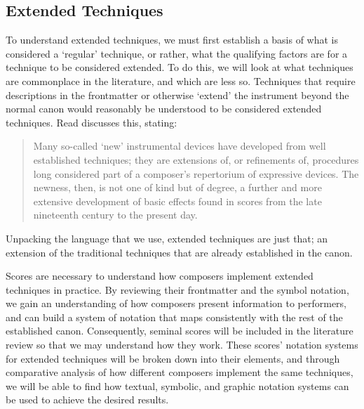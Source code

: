 \subsection{Extended Techniques}
To understand extended techniques, we must first establish a basis of what is considered a `regular' technique, or rather, what the qualifying factors are for a technique to be considered extended.
To do this, we will look at what techniques are commonplace in the literature, and which are less so.
Techniques that require descriptions in the frontmatter or otherwise `extend' the instrument beyond the normal canon would reasonably be understood to be considered extended techniques.
Read discusses this, stating:
\begin{quotation}
    Many so-called ‘new’ instrumental devices have developed from well established techniques; they are extensions of, or refinements of, procedures long considered part of a composer’s repertorium of expressive devices. 
    The newness, then, is not one of kind but of degree, a further and more extensive development of basic effects found in scores from the late nineteenth century to the present day.\autocite[3]{readContemporaryInstrumentalTechniques1976}
\end{quotation}
Unpacking the language that we use, extended techniques are just that; an extension of the traditional techniques that are already established in the canon. 

Scores are necessary to understand how composers implement extended techniques in practice.
By reviewing their frontmatter and the symbol notation, we gain an understanding of how composers present information to performers, and can build a system of notation that maps consistently with the rest of the established canon.
Consequently, seminal scores will be included in the literature review so that we may understand how they work. 
These scores' notation systems for extended techniques will be broken down into their elements, and through comparative analysis of how different composers implement the same techniques, we will be able to find how textual, symbolic, and graphic notation systems can be used to achieve the desired results.

